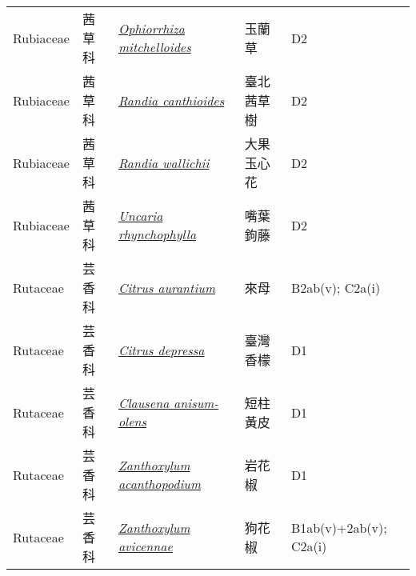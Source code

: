 {\begin{longtable}{L{2.5cm}L{2cm}L{5cm}L{2.5cm}L{3cm}}
    Rubiaceae & 茜草科 & \href{http://www.theplantlist.org/tpl1.1/search?q=Ophiorrhiza+mitchelloides}{\textit{Ophiorrhiza mitchelloides} } & 玉蘭草 & D2    \\
    Rubiaceae & 茜草科 & \href{http://www.theplantlist.org/tpl1.1/search?q=Randia+canthioides}{\textit{Randia canthioides} } & 臺北茜草樹 & D2    \\
    Rubiaceae & 茜草科 & \href{http://www.theplantlist.org/tpl1.1/search?q=Randia+wallichii}{\textit{Randia wallichii} } & 大果玉心花 & D2    \\
    Rubiaceae & 茜草科 & \href{http://www.theplantlist.org/tpl1.1/search?q=Uncaria+rhynchophylla}{\textit{Uncaria rhynchophylla} } & 嘴葉鉤藤 & D2    \\
    Rutaceae & 芸香科 & \href{http://www.theplantlist.org/tpl1.1/search?q=Citrus+aurantium}{\textit{Citrus aurantium} } & 來母 & B2ab(v); C2a(i)    \\
    Rutaceae & 芸香科 & \href{http://www.theplantlist.org/tpl1.1/search?q=Citrus+depressa}{\textit{Citrus depressa} } & 臺灣香檬 & D1    \\
    Rutaceae & 芸香科 & \href{http://www.theplantlist.org/tpl1.1/search?q=Clausena+anisum-olens}{\textit{Clausena anisum-olens} } & 短柱黃皮 & D1    \\
    Rutaceae & 芸香科 & \href{http://www.theplantlist.org/tpl1.1/search?q=Zanthoxylum+acanthopodium}{\textit{Zanthoxylum acanthopodium} } & 岩花椒 & D1    \\
    Rutaceae & 芸香科 & \href{http://www.theplantlist.org/tpl1.1/search?q=Zanthoxylum+avicennae}{\textit{Zanthoxylum avicennae} } & 狗花椒 & B1ab(v)+2ab(v); C2a(i)    \\

\end{longtable}}
